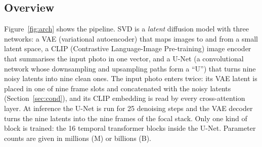 \documentclass[11pt]{article}
\begin{document}
\subsection{Overview}
Figure~\ref{fig:arch} shows the pipeline.
SVD is a \emph{latent} diffusion model with three networks: a VAE (variational autoencoder) that maps images to and from a small latent space, a CLIP (Contrastive Language-Image Pre-training) image encoder that summarises the input photo in one vector, and a U-Net (a convolutional network whose downsampling and upsampling paths form a ``U'') that turns nine noisy latents into nine clean ones.
The input photo enters twice: its VAE latent is placed in one of nine frame slots and concatenated with the noisy latents (Section~\ref{sec:cond}), and its CLIP embedding is read by every cross-attention layer.
At inference the U-Net is run for 25 denoising steps and the VAE decoder turns the nine latents into the nine frames of the focal stack.
Only one kind of block is trained: the 16 temporal transformer blocks inside the U-Net. Parameter counts are given in millions (M) or billions (B).
\end{document}
